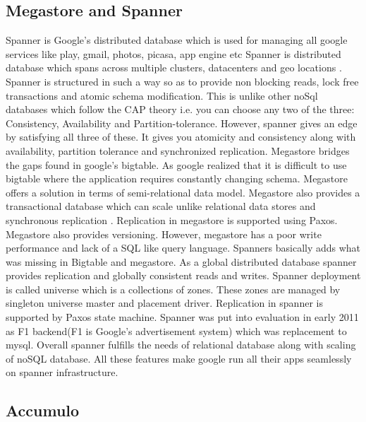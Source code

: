 {     \pv

\subsection{Megastore and Spanner}

     Spanner is Google's distributed database
     which is used for managing all google services like play, gmail,
     photos, picasa, app engine etc Spanner is distributed database
     which spans across multiple clusters, datacenters and geo
     locations \cite{corbett-spanner}.
     Spanner is structured in such a way so as to provide
     non blocking reads, lock free transactions and atomic schema
     modification. This is unlike other noSql databases which follow
     the CAP theory i.e. you can choose any two of the three:
     Consistency, Availability and Partition-tolerance. However,
     spanner gives an edge by satisfying all three of these. It gives
     you atomicity and consistency along with availability, partition
     tolerance and synchronized replication.  Megastore bridges the
     gaps found in google's bigtable. As google realized that it is
     difficult to use bigtable where the application requires
     constantly changing schema. Megastore offers a solution in terms
     of semi-relational data model.  Megastore also provides a transactional
     database which can scale unlike relational data stores and
     synchronous replication \cite{www-magastore-spanner}.
     Replication in megastore is supported
     using Paxos. Megastore also provides versioning. However,
     megastore has a poor write performance and lack of a SQL like
     query language. Spanners basically adds what was missing in
     Bigtable and megastore. As a global distributed database spanner
     provides replication and globally consistent reads and
     writes. Spanner deployment is called universe which is a
     collections of zones. These zones are managed by singleton
     universe master and placement driver. Replication in spanner is
     supported by Paxos state machine. Spanner was put into evaluation
     in early 2011 as F1 backend(F1 is Google's advertisement system)
     which was replacement to mysql. Overall spanner fulfills the needs
     of relational database along with scaling of noSQL database.  All
     these features make google run all their apps seamlessly on
     spanner infrastructure.

     \pv

\subsection{Accumulo}

}
